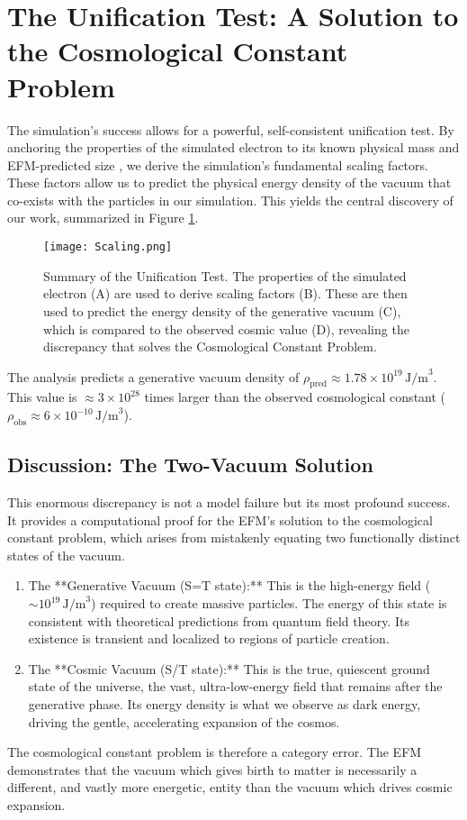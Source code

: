 \documentclass[11pt, twoside]{article}
\begin{document}
\section{The Unification Test: A Solution to the Cosmological Constant Problem}
The simulation's success allows for a powerful, self-consistent unification test. By anchoring the properties of the simulated electron to its known physical mass and EFM-predicted size \citep{EFMmassgen}, we derive the simulation's fundamental scaling factors. These factors allow us to predict the physical energy density of the vacuum that co-exists with the particles in our simulation. This yields the central discovery of our work, summarized in Figure \ref{fig:scaling}.

\begin{figure}[htbp!]
    \centering
    \texttt{[image: Scaling.png]}
    \caption{Summary of the Unification Test. The properties of the simulated electron (A) are used to derive scaling factors (B). These are then used to predict the energy density of the generative vacuum (C), which is compared to the observed cosmic value (D), revealing the discrepancy that solves the Cosmological Constant Problem.}
    \label{fig:scaling}
\end{figure}

The analysis predicts a generative vacuum density of \(\rho_{\text{pred}} \approx 1.78 \times 10^{19} \, \text{J/m}^3\). This value is \(\approx 3 \times 10^{28}\) times larger than the observed cosmological constant (\(\rho_{\text{obs}} \approx 6 \times 10^{-10} \, \text{J/m}^3\)).

\subsection{Discussion: The Two-Vacuum Solution}
This enormous discrepancy is not a model failure but its most profound success. It provides a computational proof for the EFM's solution to the cosmological constant problem, which arises from mistakenly equating two functionally distinct states of the vacuum.
\begin{enumerate}
    \item The **Generative Vacuum (S=T state):** This is the high-energy field (\(\sim10^{19} \, \text{J/m}^3\)) required to create massive particles. The energy of this state is consistent with theoretical predictions from quantum field theory. Its existence is transient and localized to regions of particle creation.
    \item The **Cosmic Vacuum (S/T state):** This is the true, quiescent ground state of the universe, the vast, ultra-low-energy field that remains after the generative phase. Its energy density is what we observe as dark energy, driving the gentle, accelerating expansion of the cosmos.
\end{enumerate}
The cosmological constant problem is therefore a category error. The EFM demonstrates that the vacuum which gives birth to matter is necessarily a different, and vastly more energetic, entity than the vacuum which drives cosmic expansion.
\end{document}
